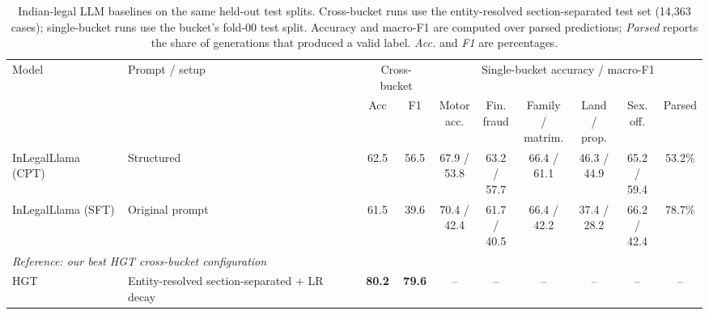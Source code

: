 \documentclass[runningheads]{llncs}
\begin{document}
\begin{table}[!htbp]
\centering
\caption{Indian-legal LLM baselines on the same held-out test splits. Cross-bucket runs use the entity-resolved section-separated test set (14{,}363 cases); single-bucket runs use the bucket's fold-00 test split. Accuracy and macro-F1 are computed over parsed predictions; \emph{Parsed} reports the share of generations that produced a valid label. \emph{Acc.} and \emph{F1} are percentages.}
\label{tab:llm-comparison}
\setlength{\tabcolsep}{4pt}
\renewcommand{\arraystretch}{1.15}
\scriptsize
\begin{adjustbox}{max width=\textwidth}
\begin{tabular}{p{3.6cm} p{2.6cm} c c c c c c c c}
\toprule
\multirow{2}{*}{Model} & \multirow{2}{*}{Prompt / setup} & \multicolumn{2}{c}{Cross-bucket} & \multicolumn{6}{c}{Single-bucket accuracy / macro-F1} \\
\cmidrule(lr){3-4}\cmidrule(lr){5-10}
 & & Acc & F1 & \makecell{Motor\\acc.} & \makecell{Fin.\\fraud} & \makecell{Family /\\matrim.} & \makecell{Land /\\prop.} & \makecell{Sex.\\off.} & Parsed \\
\midrule

InLegalLlama (CPT) &
Structured &
62.5 & 56.5 &
\makecell{67.9 /\\53.8} &
\makecell{63.2 /\\57.7} &
\makecell{66.4 /\\61.1} &
\makecell{46.3 /\\44.9} &
\makecell{65.2 /\\59.4} &
53.2\% \\

InLegalLlama (SFT) &
Original prompt &
61.5 & 39.6 &
\makecell{70.4 /\\42.4} &
\makecell{61.7 /\\40.5} &
\makecell{66.4 /\\42.2} &
\makecell{37.4 /\\28.2} &
\makecell{66.2 /\\42.4} &
78.7\% \\

\midrule
\multicolumn{10}{l}{\textit{Reference: our best HGT cross-bucket configuration}} \\
\midrule

HGT &
Entity-resolved section-separated + LR decay &
\textbf{80.2} & \textbf{79.6} &
-- & -- & -- & -- & -- & -- \\

\bottomrule
\end{tabular}
\end{adjustbox}
\end{table}
\end{document}
